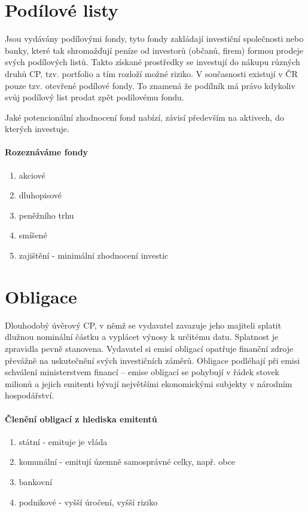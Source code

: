 \section*{Podílové listy}

Jsou vydávány podílovými fondy, tyto fondy zakládají investiční společnosti nebo banky, které tak shromažďují peníze od investorů (občanů, firem) formou prodeje svých podílových listů. Takto získané prostředky se investují do nákupu různých druhů CP, tzv. portfolio a tím rozloží možné riziko. V současnosti existují v ČR pouze tzv. otevřené podílové fondy. To znamená že podílník má právo kdykoliv svůj podílový list prodat zpět podílovému fondu.

Jaké potencionální zhodnocení fond nabízí, závisí především na aktivech, do kterých investuje.

\paragraph{Rozeznáváme fondy}
\begin{enumerate}
    \item akciové 
    \item dluhopisové
    \item peněžního trhu
    \item smíšené
    \item zajištění - minimální zhodnocení investic
\end{enumerate}

\section*{Obligace}

Dlouhodobý úvěrový CP, v němž se vydavatel zavazuje jeho majiteli splatit dlužnou nominální částku a vyplácet výnosy k určitému datu. Splatnost je zpravidla pevně stanovena. Vydavatel si emisí obligací opatřuje finanční zdroje převážně na uskutečnění svých investičních záměrů. Obligace podléhají při emisi schválení ministerstvem financí -- emise obligací se pohybují v řádek stovek milionů a jejich emitenti bývají největšími ekonomickými subjekty v národním hospodářství.

\paragraph{Členění obligací z hlediska emitentů}
\begin{enumerate}
    \item státní - emituje je vláda
    \item komunální - emitují územně samosprávné celky, např. obce
    \item bankovní
    \item podnikové - vyšší úročení, vyšší riziko
\end{enumerate}


